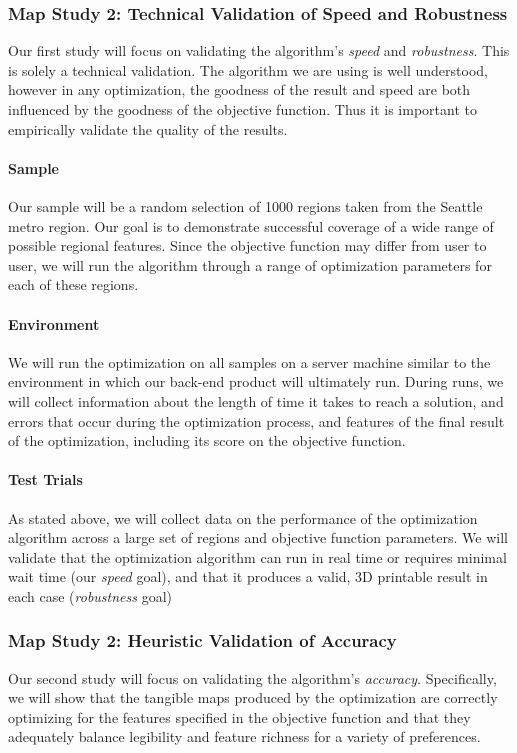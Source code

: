 \subsubsection{Map Study 2: Technical Validation of Speed and Robustness}
\label{sec:technical-validation}
Our first study will focus on validating the algorithm's {\em speed} and {\em robustness}. This is solely a technical validation. The algorithm we are using is well understood, however in any optimization, the goodness of the result and speed are both influenced by the goodness of the objective function. Thus it is important to empirically validate the quality of the results.

\paragraph{Sample} 
Our sample will be a random selection of 1000 regions taken from the Seattle metro region. Our goal is to demonstrate successful coverage of a wide range of possible regional features. Since the objective function may differ from user to user, we will run the algorithm through a range of optimization parameters for each of these regions. 


\paragraph{Environment}
We will run the optimization on all samples on a server machine similar to the environment in which our back-end product will ultimately run. During runs, we will collect information about the length of time it takes to reach a solution, and errors that occur during the optimization process, and features of the final result of the optimization, including its score on the objective function. 

\paragraph{Test Trials}
As stated above, we will collect data on the performance of the optimization algorithm across a large set of regions and objective function parameters. We will validate that the optimization algorithm can run in real time or requires minimal wait time (our {\em speed} goal), and that it  produces a valid, 3D printable result in each case ({\em robustness} goal)

\subsubsection{Map Study 2: Heuristic Validation of Accuracy}
\label{sec:technical-validation}
Our second  study will focus on validating the algorithm's {\em accuracy}. Specifically, we will
show that the tangible maps produced by the optimization are correctly optimizing for the features specified in the 
objective function and that they adequately balance legibility and feature richness for a variety of preferences.  

